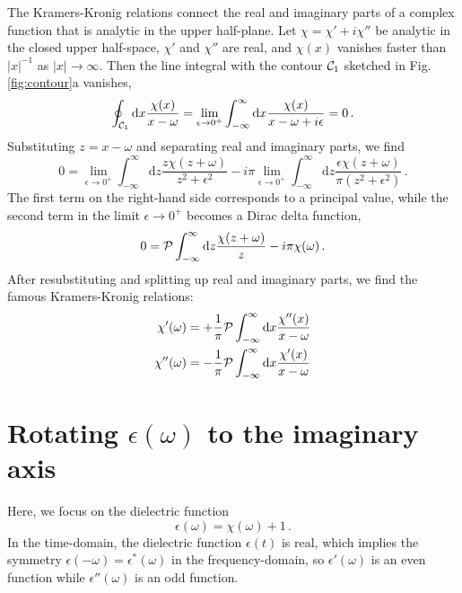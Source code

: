 \documentclass[twocolumn,superscriptaddress,pre]{revtex4-1}
\begin{document}
The Kramers-Kronig relations connect the real and imaginary parts of a complex
function that is analytic in the upper half-plane. Let $\chi=\chi'+i\chi''$ be
analytic in the closed upper half-space, $\chi'$ and $\chi''$ are real, and
$\chi(x)$ vanishes faster than $|x|^{-1}$ as $|x|\to\infty$. Then the line
integral with the contour ${\cal C}_1$ sketched in Fig. \ref{fig:contour}a vanishes,
\begin{equation}
\oint_{{\cal C}_1} \mathrm{d}x \frac{\chi(x)}{x-\omega} = \lim_{\epsilon\to0^+} \int_{-\infty}^\infty \mathrm{d}x \frac{\chi(x)}{x-\omega+i\epsilon} = 0 \,.
\end{equation}
Substituting $z=x-\omega$ and separating real and imaginary parts, we find
\begin{equation}
0 = \lim_{\epsilon\to0^+}\int_{-\infty}^\infty \mathrm{d}z \frac{z \chi(z+\omega)}{z^2+\epsilon^2} - i\pi \lim_{\epsilon\to0^+} \int_{-\infty}^\infty \mathrm{d}z \frac{\epsilon \chi(z+\omega)}{\pi(z^2+\epsilon^2)} \,.
\end{equation}
The first term on the right-hand side corresponds to a principal value, while
the second term in the limit $\epsilon\to0^+$ becomes a Dirac delta function,
\begin{equation}
0 = {\cal P} \int_{-\infty}^\infty \mathrm{d}z \frac{\chi(z+\omega)}{z} - i\pi \chi(\omega) \,.
\end{equation}
After resubstituting and splitting up real and imaginary parts, we find the
famous Kramers-Kronig relations:
\begin{align}
\label{eq:KK1}
\chi'(\omega)  &= +\frac{1}{\pi} {\cal P} \int_{-\infty}^\infty \mathrm{d}x \frac{\chi''(x)}{x-\omega} \\
\label{eq:KK2}
\chi''(\omega) &= -\frac{1}{\pi} {\cal P} \int_{-\infty}^\infty \mathrm{d}x \frac{\chi'(x) }{x-\omega}
\end{align}


\section{Rotating $\epsilon(\omega)$ to the imaginary axis}

Here, we focus on the dielectric function
\begin{equation}
\epsilon(\omega)=\chi(\omega)+1 \,.
\end{equation}
In the time-domain, the dielectric function $\epsilon(t)$ is real, which
implies the symmetry $\epsilon(-\omega) = \epsilon^*(\omega)$ in the
frequency-domain, so $\epsilon'(\omega)$ is an even function while
$\epsilon''(\omega)$ is an odd function.
\end{document}
